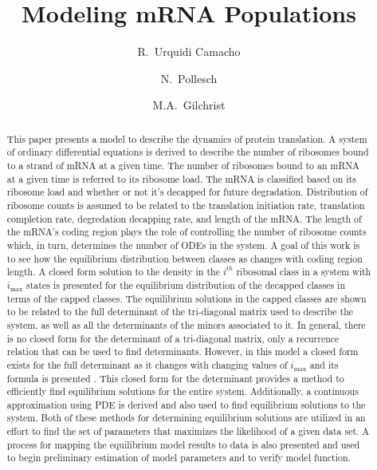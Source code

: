 \documentclass[review]{elsarticle}
\newcommand{\imax}{\ensuremath{{i_{\max}}}\xspace}
\begin{document}
\title{Modeling mRNA Populations}
\author[utkgst]{R.~Urquidi Camacho}
\author[utkm,curradd]{N.~Pollesch}
\author[utkgst,utkeeb,nimbios,cor1]{M.A.~Gilchrist}
\address[utkgst]{Genome Science and Technology Program, University of Tennessee, Knoxville, TN 37996-XXX}
\address[utkm]{Department of Mathematics, University of Tennessee,  Knoxville, TN 37996-1320}
\address[utkeeb]{Department of Ecology and Evolutionary Biology, University of Tennessee, Knoxville, TN 37996-1610}
\address[nimbios]{National Institute for Mathematical and Biological Synthesis, University of Tennessee, Knoxville, TN 37996-3410}

\begin{abstract}
This paper presents a model to describe the dynamics of protein translation.  
A system of ordinary differential equations is derived to describe the number of ribosomes bound to a strand of mRNA at a given time.
The number of ribosomes bound to an mRNA at a given time is referred to its ribosome load.
The mRNA is classified based on its ribosome load and whether or not it's decapped for future degradation.  
Distribution of ribosome counts is assumed to be related to the translation initiation rate, translation completion rate, degredation decapping rate, and length of the mRNA.
The length of the mRNA's coding region plays the role of controlling the number of ribosome counts which, in turn, determines the number of ODEs in the system.  
A goal of this work is to see how the equilibrium distribution between classes as changes with coding region length.
A closed form solution to the density in the $i^{th}$ ribosomal class in a system with \imax states is presented for the equilibrium distribution of the decapped classes in terms of the capped classes.
The equilibrium solutions in the capped classes are shown to be related to the full determinant of the tri-diagonal matrix used to describe the system, as well as all the determinants of the minors associated to it.
In general, there is no closed form for the determinant of a tri-diagonal matrix, only a recurrence relation that can be used to find determinants.
However, in this model a closed form exists for the full determinant as it changes with changing values of \imax and its formula is presented .
This closed form for the determinant provides a method to efficiently find equilibrium solutions for the entire system.
Additionally, a continuous approximation using PDE is derived and also used to find equilibrium solutions to the system.
Both of these methods for determining equilibrium solutions are utilized in an effort to find the set of parameters that maximizes the likelihood of a given data set.
A process for mapping the equilibrium model results to data is also presented and used to begin preliminary estimation of model parameters and to verify model function.
 

\end{abstract}
\end{document}
